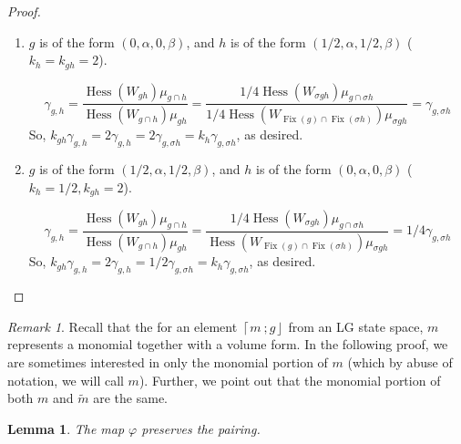 \documentclass[10pt, letterpaper]{amsart}
\newtheorem{lem}[thm]{Lemma}
\theoremstyle{remark}
\newtheorem{rem}{Remark}[thm]
\newcommand{\fjrw}[2]{ \left\lceil #1 \:; #2 \right\rfloor }
\DeclareMathOperator{\Hess}{Hess}
\DeclareMathOperator{\Fix}{Fix}
\begin{document}
\begin{proof}
\begin{enumerate}
\item $g$ is of the form $(0, \alpha, 0, \beta)$, and $h$ is of the form $(1/2, \alpha, 1/2, \beta)$ ($k_h = k_{gh}= 2$).

\[
\gamma_{g,h}  =
\frac{\Hess (W_{gh})\mu_{g \cap h}}{\Hess (W_{g\cap h})\mu_{gh}} 
=\frac{1/4 \Hess (W_{\sigma gh})\mu_{ g \cap \sigma h}}{1/4 \Hess (W_{\Fix( g)\cap \Fix(\sigma h)})\mu_{\sigma gh}} 
=  \gamma_{g,\sigma h}
\]
So, 
$k_{gh}\gamma_{g,h} = 2 \gamma_{g,h} = 2\gamma_{g,\sigma h} = k_{h}\gamma_{g,\sigma h}$, as desired. 

\item $g$ is of the form $(1/2, \alpha, 1/2, \beta)$, and $h$ is of the form $(0, \alpha, 0, \beta)$ ($k_h= 1/2,  k_{gh}= 2$).

\[
\gamma_{g,h}  =
\frac{\Hess (W_{gh})\mu_{g \cap h}}{\Hess (W_{g\cap h})\mu_{gh}} 
=\frac{1/4\Hess (W_{\sigma gh})\mu_{ g \cap \sigma h}}{\Hess (W_{\Fix( g)\cap \Fix(\sigma h)})\mu_{\sigma gh}} 
=  1/4\gamma_{g,\sigma h}
\]
So, 
$k_{gh}\gamma_{g,h} = 2 \gamma_{g,h} = 1/2\gamma_{g,\sigma h} = k_{h}\gamma_{g,\sigma h}$, as desired. 
\fi
\end{enumerate}
 
\end{proof}

\begin{rem}
Recall that the for an element $\fjrw{m}{g}$ from an LG state space, $m$ represents a monomial together with a volume form.  In the following proof, we are sometimes interested in only the monomial portion of $m$ (which by abuse of notation, we will call $m$).  Further, we point out that the monomial portion of both $m$ and $\tilde{m}$ are the same. 
\end{rem}

\begin{lem}The map $\varphi$ preserves the pairing. 
\end{lem}
\end{document}
